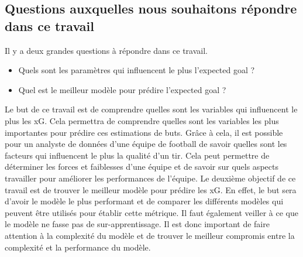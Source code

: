 \documentclass[12pt]{article}
\begin{document}
\subsection{Questions auxquelles nous souhaitons répondre dans ce travail}
Il y a deux grandes questions à répondre dans ce travail.
\begin{itemize}
    \item Quels sont les paramètres qui influencent le plus l'expected goal ?
    \item Quel est le meilleur modèle pour prédire l'expected goal ?
\end{itemize}

Le but de ce travail est de comprendre quelles sont les variables qui influencent le plus les xG.
Cela permettra de comprendre quelles sont les variables les plus importantes pour prédire ces estimations de buts.
Grâce à cela, il est possible pour un analyste de données d'une équipe de football de savoir quelles sont les facteurs qui influencent le plus la qualité d'un tir.
Cela peut permettre de déterminer les forces et faiblesses d'une équipe et de savoir sur quels aspects travailler pour améliorer les performances de l'équipe.
\newline \newline
Le deuxième objectif de ce travail est de trouver le meilleur modèle pour prédire les xG.
En effet, le but sera d'avoir le modèle le plus performant et de comparer les différents modèles qui peuvent être utilisés pour établir cette métrique.
Il faut également veiller à ce que le modèle ne fasse pas de sur-apprentissage. Il est donc important de faire attention à la complexité du modèle et de trouver le meilleur compromis entre la complexité et la performance du modèle.

\newpage
\end{document}
